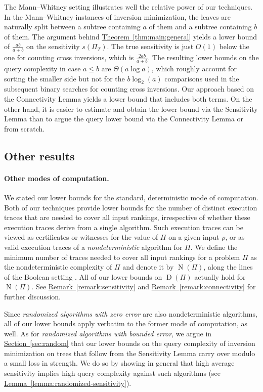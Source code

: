 \documentclass[11pt]{article}
\numberwithin{equation}{section}
\theoremstyle{definition}
\theoremstyle{plain}
\newcommand{\expref}[2]{\hyperref[#2]{#1~\ref{#2}}}
\newcommand{\ranking}{\rho}
\DeclareMathOperator{\traces}{D}
\DeclareMathOperator{\NQ}{N}
\begin{document}
The Mann--Whitney setting illustrates well the relative power of our techniques. In the Mann--Whitney instances of inversion minimization, the leaves are naturally split between a subtree containing $a$ of them and a subtree containing $b$ of them. The argument behind \expref{Theorem}{thm:main:general} yields a lower bound of $\frac{ab}{a+b}$ on the sensitivity $s(\Pi_T)$. The true sensitivity is just $O(1)$ below the one for counting cross inversions, which is $\frac{2ab}{a+b}$. The resulting lower bounds on the query complexity in case $a \le b$ are $\Theta(a \log a)$, which roughly account for sorting the smaller side but not for the $b \log_2(a)$ comparisons used in the subsequent binary searches for counting cross inversions. Our approach based on the Connectivity Lemma yields a lower bound that includes both terms. On the other hand, it is easier to estimate and obtain the lower bound via the Sensitivity Lemma than to argue the query lower bound via the Connectivity Lemma or from scratch. 

\subsection{Other results}
%

\paragraph{Other modes of computation.}
We stated our lower bounds for the standard, deterministic mode of computation. Both of our techniques provide lower bounds for the number of distinct execution traces that are needed to cover all input rankings, irrespective of whether these execution traces derive from a single algorithm. Such execution traces can be viewed as certificates or witnesses for the value of $\Pi$ on a given input $\ranking$, or as valid execution traces of a \emph{nondeterministic} algorithm for $\Pi$. We define the minimum number of traces needed to cover all input rankings for a problem $\Pi$ as the nondeterministic complexity of $\Pi$ and denote it by $\NQ(\Pi)$, along the lines of the Boolean setting \cite{JRSW99}. All of our lower bounds on $\traces(\Pi)$ actually hold for $\NQ(\Pi)$. See \expref{Remark}{remark:sensitivity} and \expref{Remark}{remark:connectivity} for further discussion.

Since \emph{randomized algorithms with zero error} are also nondeterministic algorithms, all of our lower bounds apply verbatim to the former mode of computation, as well. As for \emph{randomized algorithms with bounded error}, we argue in \expref{Section}{sec:random} that our lower bounds on the query complexity of inversion minimization on trees that follow from the Sensitivity Lemma carry over modulo a small loss in strength. We do so by showing in general %
%
%
that high average sensitivity implies high query complexity against such algorithms (see \expref{Lemma}{lemma:randomized-sensitivity}).
\end{document}
